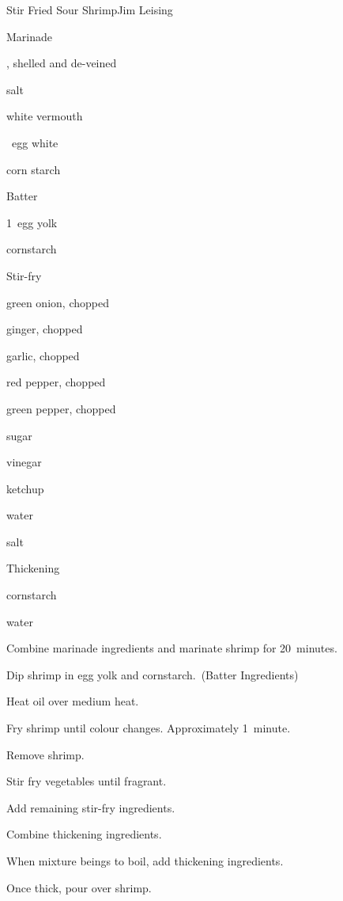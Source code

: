 \begin{recipe}{Stir Fried Sour Shrimp}{Jim Leising}{}

Marinade
\begin{ingredients}
\item \lbs{\twothird} , shelled and de-veined
\item \tp{\quarter} salt
\item \tp{\half} white vermouth
\item \half~egg white
\item {} corn starch
\end{ingredients}

Batter
\begin{ingredients}
\item 1~egg yolk
\item \Tp{1\half} cornstarch
\end{ingredients}

Stir-fry
\begin{ingredients}
\item \Tp{\half} green onion, chopped
\item \Tp{\half} ginger, chopped
\item \Tp{\half} garlic, chopped
\item \Tp{\half} red pepper, chopped
\item {} green pepper, chopped
\item {} sugar
\item {} vinegar
\item {} ketchup
\item {} water
\item \tp{\quarter} salt
\end{ingredients}

Thickening
\begin{ingredients}
\item \tp{\half} cornstarch
\item \Tp{\half} water
\end{ingredients}

\begin{directions}
\item Combine marinade ingredients and marinate shrimp for 20~minutes.
\item Dip shrimp in egg yolk and cornstarch.~(Batter Ingredients)
\item Heat oil over medium heat.
\item Fry shrimp until colour changes. Approximately 1~minute.
\item Remove shrimp.
\item Stir fry vegetables until fragrant.
\item Add remaining stir-fry ingredients.
\item Combine thickening ingredients.
\item When mixture beings to boil, add thickening ingredients.
\item Once thick, pour over shrimp.
\end{directions}

\end{recipe}
